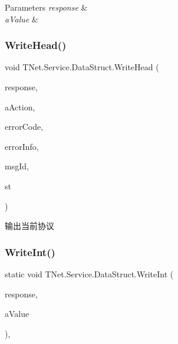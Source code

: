 \begin{DoxyParams}{Parameters}
{\em response} & \\
\hline
{\em a\+Value} & \\
\hline
\end{DoxyParams}
\mbox{\label{class_t_net_1_1_service_1_1_data_struct_ae3bae60115f855029d3f60687480c9f5}} 
\subsubsection{\texorpdfstring{Write\+Head()}{WriteHead()}}
{\footnotesize\ttfamily void T\+Net.\+Service.\+Data\+Struct.\+Write\+Head (\begin{DoxyParamCaption}\item[{\mbox{\hyperlink{class_t_net_1_1_service_1_1_base_game_response}{Base\+Game\+Response}}}]{response,  }\item[{int}]{a\+Action,  }\item[{int}]{error\+Code,  }\item[{string}]{error\+Info,  }\item[{int}]{msg\+Id,  }\item[{string}]{st }\end{DoxyParamCaption})\hspace{0.3cm}{\ttfamily [protected]}}



输出当前协议 

\mbox{\label{class_t_net_1_1_service_1_1_data_struct_ac1fb1c8e32acefb3e5d855c7f60e924a}} 
\subsubsection{\texorpdfstring{Write\+Int()}{WriteInt()}}
{\footnotesize\ttfamily static void T\+Net.\+Service.\+Data\+Struct.\+Write\+Int (\begin{DoxyParamCaption}\item[{\mbox{\hyperlink{class_t_net_1_1_service_1_1_base_game_response}{Base\+Game\+Response}}}]{response,  }\item[{Int32}]{a\+Value }\end{DoxyParamCaption})\hspace{0.3cm}{\ttfamily [static]}, {\ttfamily [protected]}}



